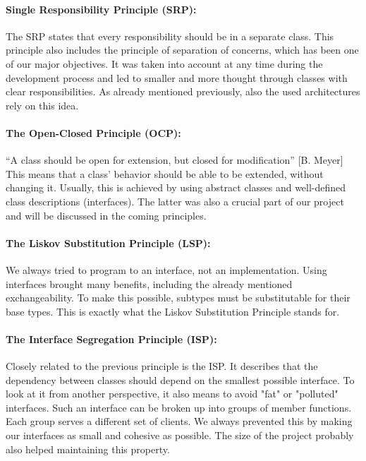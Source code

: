 \paragraph{Single Responsibility Principle (SRP):}
The SRP states that every responsibility should be in a separate class. This principle also includes the principle of separation of concerns, which has been one of our major objectives. It was taken into account at any time during the development process and led to smaller and more thought through classes with clear responsibilities. As already mentioned previously, also the used architectures rely on this idea.
\paragraph{The Open-Closed Principle (OCP):}
``A class should be open for extension, but closed for modification'' [B. Meyer]\\
This means that a class' behavior should be able to be extended, without changing it. Usually, this is achieved by using abstract classes and well-defined class descriptions (interfaces). The latter was also a crucial part of our project and will be discussed in the coming principles.
\paragraph{The Liskov Substitution Principle (LSP):}
We always tried to program to an interface, not an implementation. Using interfaces brought many benefits, including the already mentioned exchangeability. To make this possible, subtypes must be substitutable for their base types. This is exactly what the Liskov Substitution Principle stands for. 
\paragraph{The Interface Segregation Principle (ISP):}
Closely related to the previous principle is the ISP. It describes that the dependency between classes should depend on the smallest possible interface. To look at it from another perspective, it also means to avoid "fat" or "polluted" interfaces. Such an interface can be broken up into groups of member functions. Each group serves a different set of clients. We always prevented this by making our interfaces as small and cohesive as possible. The size of the project probably also helped maintaining this property.
